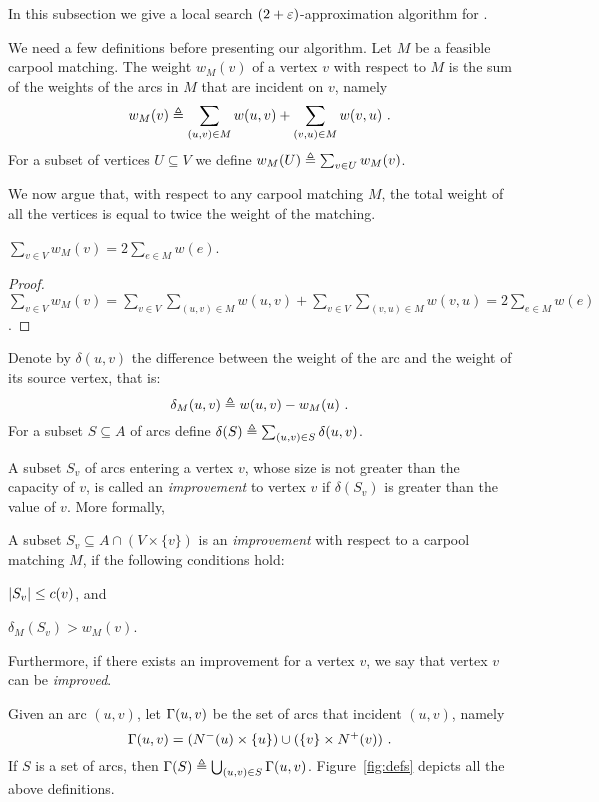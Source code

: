 
In this subsection we give a local search $(2+\varepsilon)$-approximation
algorithm for \carpool.

We need a few definitions before presenting our algorithm.
%
Let $M$ be a feasible carpool matching.  The weight $w_M(v)$ of a
vertex $v$ with respect to $M$ is the sum of the weights of the arcs
in $M$ that are incident on $v$, namely
\[
w_M(v) \triangleq \sum_{(u, v) \in M} w(u, v) + \sum_{(v, u) \in M} w(v, u)
~.
\]
For a subset of vertices $U \subseteq V$ we define
$w_M(U) \triangleq \sum_{v \in U} w_M(v)$.

We now argue that, with respect to any carpool matching $M$, the total
weight of all the vertices is equal to twice the weight of the matching.

\begin{observation}
\label{lm:val-twice}
$\sum_{v \in V} w_M(v) = 2 \sum_{e \in M} w(e)$.
\end{observation}
\begin{proof}
\(
\sum_{v \in V} w_M(v)
= \sum_{v \in V} \sum_{(u, v) \in M} w(u, v) +
    \sum_{v \in V} \sum_{(v, u) \in M} w(v, u) 
= 2 \sum_{e \in M} w(e)
\).
\end{proof}

Denote by $\delta(u,v)$ the difference between the weight of the arc
and the weight of its source vertex, that is:
\[
\delta_M(u, v) \triangleq w(u, v) - w_M(u)
~.
\]
For a subset $S \subseteq A$ of arcs define
$\delta(S) \triangleq \sum_{(u,v) \in S} \delta(u,v)$.

A subset $S_v$ of arcs entering a vertex $v$, whose size is not
greater than the capacity of $v$, is called an \emph{improvement} to
vertex $v$ if $\delta(S_v)$ is greater than the value of $v$.  More
formally, 

\begin{definition}
A subset $S_v \subseteq A \cap (V \times \{v\})$ is
an \emph{improvement} with respect to a carpool matching $M$, if the
following conditions hold:%
\begin{inparaenum}[(i)]
\item $\left| S_v \right| \leq c(v)$, and
\item $\delta_M(S_v) > w_M(v)$.
\end{inparaenum}
Furthermore, if there exists an improvement for a vertex $v$, we say
that vertex $v$ can be \emph{improved}.
\end{definition}

Given an arc $(u,v)$, let $\Gamma(u,v)$ be the set of arcs that incident
$(u, v)$, namely
\[
\Gamma(u,v) = (N^-(u) \times \{u\}) \cup (\{v\} \times N^+(v))
~.
\]
If $S$ is a set of arcs, then $\Gamma(S) \triangleq \bigcup_{(u,v) \in
S} \Gamma(u,v)$.
%
Figure~\ref{fig:defs} depicts all the above definitions.

